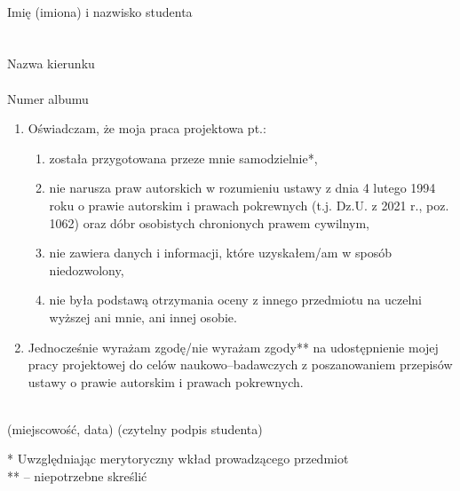 \documentclass{urdpl}
\begin{document}
\begin{center}
    \vspace*{10mm}
    \vspace*{10mm}
\end{center}

\noindent
\dotuline{\hspace{1.3cm}\@author\hspace{1.3cm}}\\
{\small Imię (imiona) i nazwisko studenta }\\

\noindent \@faculty\\

\noindent \dotuline{\hspace{1.4cm}\@degreeprogramme \hspace{1.4cm}}\\
{\small Nazwa kierunku} \\

\noindent \dotuline{\hspace{1.8cm}\@noAlbum\hspace{1.9cm}}\\
{\small Numer albumu}

\begin{enumerate}
    \item Oświadczam, że moja praca projektowa pt.: \@titlePL
          \begin{enumerate}[label=\arabic*)]
              \item została przygotowana przeze mnie samodzielnie*,
              \item nie narusza praw autorskich w rozumieniu ustawy z dnia 4 lutego 1994 roku o prawie autorskim i prawach pokrewnych (t.j. Dz.U. z 2021 r., poz. 1062) oraz dóbr osobistych chronionych prawem cywilnym,
              \item nie zawiera danych i informacji, które uzyskałem/am w sposób niedozwolony,
              \item nie była podstawą otrzymania oceny z innego przedmiotu na uczelni wyższej ani mnie, ani innej osobie.
          \end{enumerate}
    \item Jednocześnie wyrażam zgodę/nie wyrażam zgody** na udostępnienie mojej pracy projektowej do celów naukowo--badawczych z poszanowaniem przepisów ustawy o prawie autorskim i prawach pokrewnych.
\end{enumerate}


\vspace*{10mm}

\noindent
\underline{\hspace{6cm}} \hfill \underline{\hspace{6cm}} \\ 
\hspace*{13mm}(miejscowość, data)  \hspace*{63mm}(czytelny podpis studenta)
\vspace*{10mm}

\vfill
\noindent
* Uwzględniając merytoryczny wkład prowadzącego przedmiot \\
** -- niepotrzebne skreślić
\end{document}
